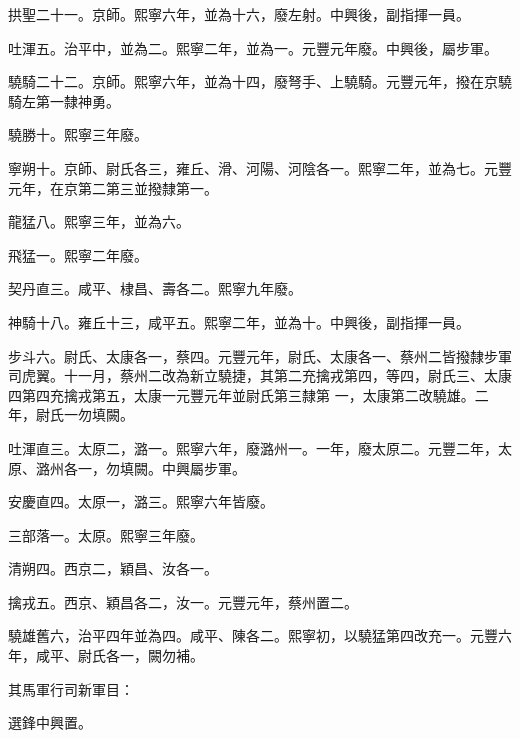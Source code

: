 \begin{pinyinscope}
 拱聖二十一。京師。熙寧六年，並為十六，廢左射。中興後，副指揮一員。



 吐渾五。治平中，並為二。熙寧二年，並為一。元豐元年廢。中興後，屬步軍。



 驍騎二十二。京師。熙寧六年，並為十四，廢弩手、上驍騎。元豐元年，撥在京驍騎左第一隸神勇。



 驍勝十。熙寧三年廢。



 寧朔十。京師、尉氏各三，雍丘、滑、河陽、河陰各一。熙寧二年，並為七。元豐元年，在京第二第三並撥隸第一。



 龍猛八。熙寧三年，並為六。



 飛猛一。熙寧二年廢。



 契丹直三。咸平、棣昌、壽各二。熙寧九年廢。



 神騎十八。雍丘十三，咸平五。熙寧二年，並為十。中興後，副指揮一員。



 步斗六。尉氏、太康各一，蔡四。元豐元年，尉氏、太康各一、蔡州二皆撥隸步軍司虎翼。十一月，蔡州二改為新立驍捷，其第二充擒戎第四，等四，尉氏三、太康四第四充擒戎第五，太康一元豐元年並尉氏第三隸第
 一，太康第二改驍雄。二年，尉氏一勿填闕。



 吐渾直三。太原二，潞一。熙寧六年，廢潞州一。一年，廢太原二。元豐二年，太原、潞州各一，勿填闕。中興屬步軍。



 安慶直四。太原一，潞三。熙寧六年皆廢。



 三部落一。太原。熙寧三年廢。



 清朔四。西京二，穎昌、汝各一。



 擒戎五。西京、穎昌各二，汝一。元豐元年，蔡州置二。



 驍雄舊六，治平四年並為四。咸平、陳各二。熙寧初，以驍猛第四改充一。元豐六年，咸平、尉氏各一，闕勿補。



 其馬軍行司新軍目：



 選鋒中興置。




\end{pinyinscope}
